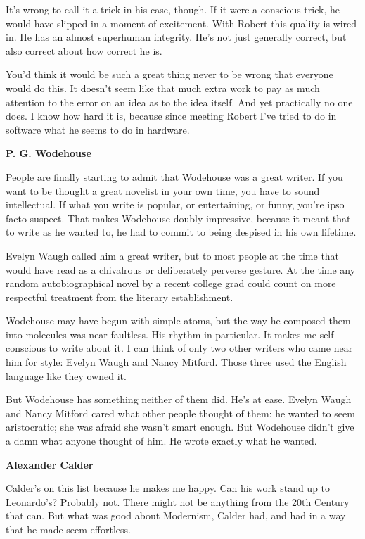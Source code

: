 It's wrong to call it a trick in his case, though. If it were a
conscious trick, he would have slipped in a moment of excitement. With
Robert this quality is wired-in. He has an almost superhuman integrity.
He's not just generally correct, but also correct about how correct he
is.

You'd think it would be such a great thing never to be wrong that
everyone would do this. It doesn't seem like that much extra work to pay
as much attention to the error on an idea as to the idea itself. And yet
practically no one does. I know how hard it is, because since meeting
Robert I've tried to do in software what he seems to do in hardware.

\textbf{P. G. Wodehouse}

People are finally starting to admit that Wodehouse was a great writer.
If you want to be thought a great novelist in your own time, you have to
sound intellectual. If what you write is popular, or entertaining, or
funny, you're ipso facto suspect. That makes Wodehouse doubly
impressive, because it meant that to write as he wanted to, he had to
commit to being despised in his own lifetime.

Evelyn Waugh called him a great writer, but to most people at the time
that would have read as a chivalrous or deliberately perverse gesture.
At the time any random autobiographical novel by a recent college grad
could count on more respectful treatment from the literary
establishment.

Wodehouse may have begun with simple atoms, but the way he composed them
into molecules was near faultless. His rhythm in particular. It makes me
self-conscious to write about it. I can think of only two other writers
who came near him for style: Evelyn Waugh and Nancy Mitford. Those three
used the English language like they owned it.

But Wodehouse has something neither of them did. He's at ease. Evelyn
Waugh and Nancy Mitford cared what other people thought of them: he
wanted to seem aristocratic; she was afraid she wasn't smart enough. But
Wodehouse didn't give a damn what anyone thought of him. He wrote
exactly what he wanted.

\textbf{Alexander Calder}

Calder's on this list because he makes me happy. Can his work stand up
to Leonardo's? Probably not. There might not be anything from the 20th
Century that can. But what was good about Modernism, Calder had, and had
in a way that he made seem effortless.

